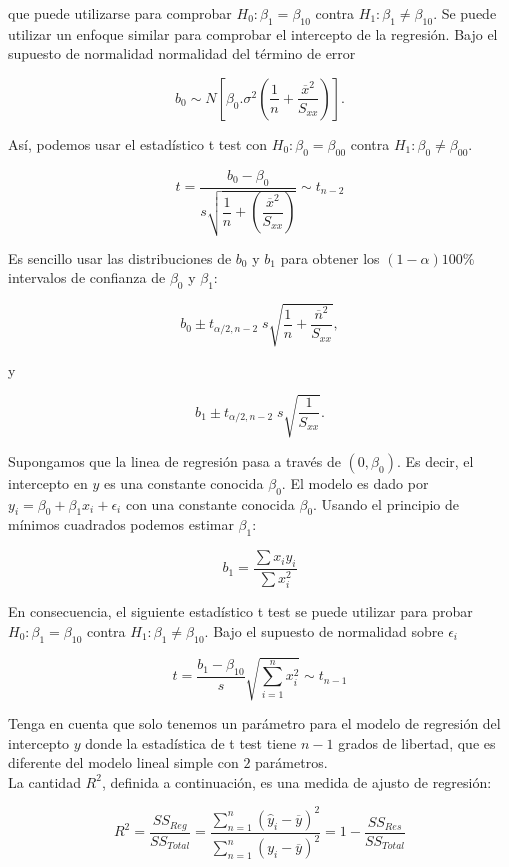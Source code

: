 que puede utilizarse para comprobar $H_0:\beta_1=\beta_{10}$ contra $H_1:\beta_1\neq\beta_{10}$. Se puede utilizar un enfoque similar para comprobar el intercepto de la regresión. Bajo el supuesto de normalidad normalidad del término de error

$$b_0\sim N\left[\beta_0.\sigma^2\left(\dfrac{1}{n}+\dfrac{\overline{x}^2}{S_{xx}}\right)\right].$$

Así, podemos usar el estadístico  t test con $H_0:\beta_0=\beta_{00}$ contra $H_1:\beta_0\neq\beta_{00}$.

$$t=\dfrac{b_0-\beta_0}{s\sqrt{\dfrac{1}{n}+\left(\dfrac{\overline{x}^2}{S_{xx}}\right)}}\sim t_{n-2}$$

Es sencillo usar las distribuciones de $b_0$ y $b_1$ para obtener los $(1 - \alpha)100\%$ intervalos de confianza de $\beta_0$ y $\beta_1$:

$$b_0\pm t_{\alpha/2,n-2}\; s\sqrt{\dfrac{1}{n}+\dfrac{\overline{n}^2}{S_{xx}}},$$

y 

$$b_1\pm t_{\alpha/2,n-2}\; s\sqrt{\dfrac{1}{S_{xx}}}.$$

Supongamos que la linea de regresión pasa a través de $(0,\beta_0)$. Es decir, el intercepto en $y$ es una constante conocida $\beta_0$. El modelo es dado por $y_i=\beta_0+\beta_1x_i+\epsilon_i$ con una constante conocida $\beta_0$. Usando el principio de mínimos cuadrados podemos estimar $\beta_1$:

$$b_1=\dfrac{\displaystyle\sum x_iy_i}{\displaystyle\sum x_i^2}$$

En consecuencia, el siguiente estadístico t test se puede utilizar para probar $H_0: \beta_1=\beta_{10}$ contra $H_1:\beta_1\neq \beta_{10}$. Bajo el supuesto de normalidad sobre $\epsilon_i$

$$t=\dfrac{b_1-\beta_{10}}{s}\sqrt{\displaystyle\sum_{i=1}^nx_i^2}\sim t_{n-1}$$

Tenga en cuenta que solo tenemos un parámetro para el modelo de regresión del intercepto $y$ donde la estadística de t test tiene $n-1$ grados de libertad, que es diferente del modelo lineal simple con $2$ parámetros.\\

La cantidad $R^2$, definida a continuación, es una medida de ajusto de regresión:

$$R^2=\dfrac{SS_{Reg}}{SS_{Total}}=\dfrac{\displaystyle\sum_{n=1}^n\left(\hat{y}_i-\overline{y}\right)^2}{\displaystyle\sum_{n=1}^n\left(y_i-\overline{y}\right)^2}=1-\dfrac{SS_{Res}}{SS_{Total}}$$


